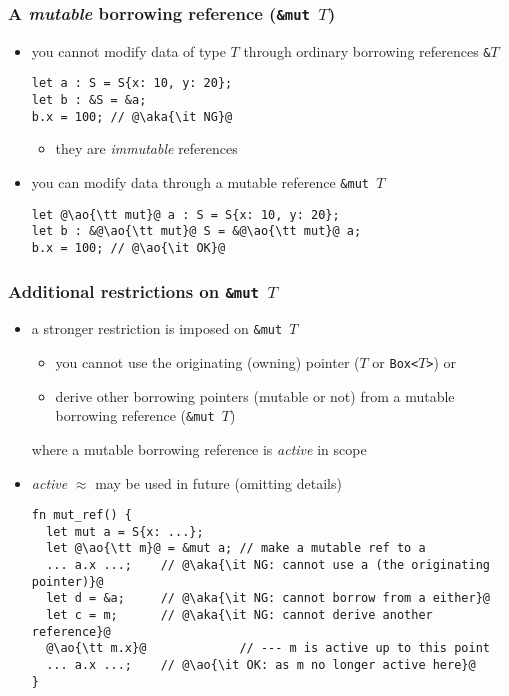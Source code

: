 \documentclass[12pt,dvipdfmx]{beamer}
\newcommand{\ao}[1]{{\color{blue}#1}}
\newcommand{\aka}[1]{{\color{red}#1}}
\begin{document}
\begin{frame}[fragile]
  \frametitle{A {\it mutable} borrowing reference ({\tt \&mut $T$})}
  \begin{itemize}
  \item you cannot modify data of type $T$
    through ordinary borrowing references {\tt \&$T$}
\begin{lstlisting}
let a : S = S{x: 10, y: 20};
let b : &S = &a;
b.x = 100; // @\aka{\it NG}@
\end{lstlisting}
    \begin{itemize}
    \item they are \ao{\it immutable} references
    \end{itemize}
  \item you can modify data through a mutable reference {\tt \&mut $T$}
\begin{lstlisting}
let @\ao{\tt mut}@ a : S = S{x: 10, y: 20};
let b : &@\ao{\tt mut}@ S = &@\ao{\tt mut}@ a;
b.x = 100; // @\ao{\it OK}@
\end{lstlisting}
  \end{itemize}
\end{frame}

\begin{frame}[fragile]
  \frametitle{Additional restrictions on {\tt \&mut $T$}}
  \begin{itemize}
  \item a stronger restriction is imposed on {\tt \&mut $T$}
    \begin{itemize}
    \item you cannot use the originating (owning) pointer
      ($T$ or {\tt Box<$T$>}) or
    \item derive other borrowing pointers (mutable or not)
      from a mutable borrowing
      reference ({\tt \&mut $T$})
    \end{itemize}
    where a mutable borrowing reference is {\it active} in scope
  \item {\it active} $\approx$ may be used in future (omitting details)
\begin{lstlisting}
fn mut_ref() {      
  let mut a = S{x: ...};
  let @\ao{\tt m}@ = &mut a; // make a mutable ref to a
  ... a.x ...;    // @\aka{\it NG: cannot use a (the originating pointer)}@
  let d = &a;     // @\aka{\it NG: cannot borrow from a either}@
  let c = m;      // @\aka{\it NG: cannot derive another reference}@
  @\ao{\tt m.x}@             // --- m is active up to this point
  ... a.x ...;    // @\ao{\it OK: as m no longer active here}@
}
\end{lstlisting}
\end{itemize}
\end{frame}
\end{document}
